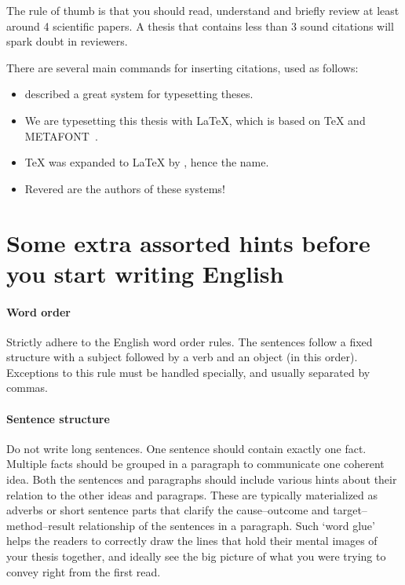 \begin{description}
The rule of thumb is that you should read, understand and briefly review at least around 4 scientific papers. A thesis that contains less than 3 sound citations will spark doubt in reviewers.
\end{description}

There are several main commands for inserting citations, used as follows:
\begin{itemize}
\item \citet{knuth1979tex} described a great system for typesetting theses.
\item We are typesetting this thesis with \LaTeX, which is based on \TeX{} and METAFONT~\cite{knuth1979tex}.
\item \TeX{} was expanded to \LaTeX{} by \citet{lamport1994latex}, hence the name.
\item Revered are the authors of these systems!~\cite{knuth1979tex,lamport1994latex}
\end{itemize}

\section{Some extra assorted hints before you start writing English}

\paragraph{Word order}
Strictly adhere to the English word order rules. The sentences follow a fixed structure with a subject followed by a verb and an object (in this order). Exceptions to this rule must be handled specially, and usually separated by commas.

\paragraph{Sentence structure}
Do not write long sentences. One sentence should contain exactly one fact. Multiple facts should be grouped in a paragraph to communicate one coherent idea. Both the sentences and paragraphs should include various hints about their relation to the other ideas and paragraps. These are typically materialized as adverbs or short sentence parts that clarify the cause--outcome and target--method--result relationship of the sentences in a paragraph. Such `word glue' helps the readers to correctly draw the lines that hold their mental images of your thesis together, and ideally see the big picture of what you were trying to convey right from the first read.

